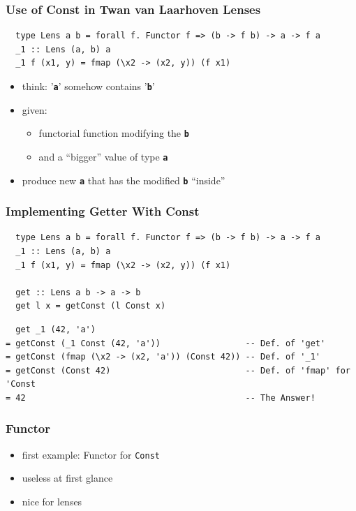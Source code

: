 \documentclass[aspectratio=169]{beamer}
\begin{document}
\begin{frame}[fragile]
  \frametitle{Use of Const in Twan van Laarhoven Lenses}
  \begin{verbatim}
  type Lens a b = forall f. Functor f => (b -> f b) -> a -> f a
  _1 :: Lens (a, b) a
  _1 f (x1, y) = fmap (\x2 -> (x2, y)) (f x1)
  \end{verbatim}
  \vfill
  \begin{itemize}
  \item think: '\textbf{\texttt{a}}' somehow contains '\textbf{\texttt{b}}'
  \item given:
    \begin{itemize}
    \item functorial function modifying the \textbf{\texttt{b}}
    \item and a ``bigger'' value of type \textbf{\texttt{a}}
    \end{itemize}
  \item produce new \textbf{\texttt{a}} that has the modified \textbf{\texttt{b}} ``inside''
  \end{itemize}
\end{frame}

\begin{frame}[fragile]
  \frametitle{Implementing Getter With Const}
  \begin{verbatim}
  type Lens a b = forall f. Functor f => (b -> f b) -> a -> f a
  _1 :: Lens (a, b) a
  _1 f (x1, y) = fmap (\x2 -> (x2, y)) (f x1)

  get :: Lens a b -> a -> b
  get l x = getConst (l Const x)
  \end{verbatim}
  \vfill
  \begin{verbatim}
  get _1 (42, 'a')
= getConst (_1 Const (42, 'a'))                 -- Def. of 'get'
= getConst (fmap (\x2 -> (x2, 'a')) (Const 42)) -- Def. of '_1'
= getConst (Const 42)                           -- Def. of 'fmap' for 'Const
= 42                                            -- The Answer!
  \end{verbatim}
\end{frame}

\begin{frame}
  \frametitle{Functor}
  \begin{itemize}
  \item first example: Functor for \texttt{Const}
  \item useless at first glance
  \item nice for lenses
  \end{itemize}
\end{frame}
\end{document}
